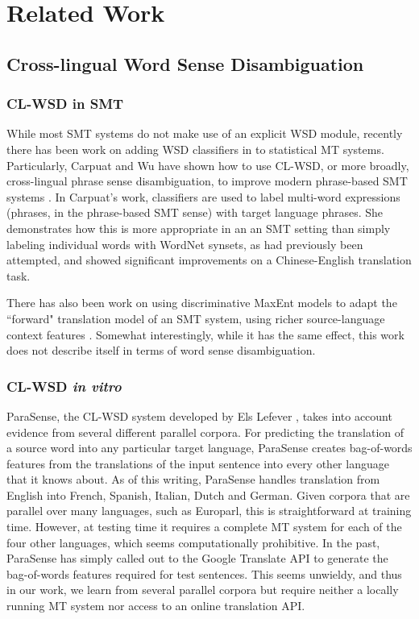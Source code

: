 \section{Related Work}
\label{sec:relatedwork}

\subsection{Cross-lingual Word Sense Disambiguation}

\subsubsection{CL-WSD in SMT}
While most SMT systems do not make use of an explicit WSD module, recently
there has been work on adding WSD classifiers in to statistical MT systems.
Particularly, Carpuat and Wu have shown how to use CL-WSD, or more broadly,
cross-lingual phrase sense disambiguation, to improve modern phrase-based SMT
systems
\cite{carpuatpsd,carpuat-wu:2007:EMNLP-CoNLL2007,carpuat2008evaluation}. In
Carpuat's work, classifiers are used to label multi-word expressions (phrases,
in the phrase-based SMT sense) with target language phrases. She demonstrates
how this is more appropriate in an an SMT setting than simply labeling
individual words with WordNet synsets, as had previously been attempted, and
showed significant improvements on a Chinese-English translation task.

There has also been work on using discriminative MaxEnt models to adapt
the ``forward" translation model of an SMT system, using richer
source-language context features \cite{vzabokrtsky-popel-marevcek:2010:WMT}.
Somewhat interestingly, while it has the same effect, this work does not
describe itself in terms of word sense disambiguation.

\subsubsection{CL-WSD \emph{in vitro}}
ParaSense, the CL-WSD system developed by Els Lefever
\cite{lefever-hoste-decock:2011:ACL-HLT2011}, takes into account evidence from
several different parallel corpora.
For predicting the translation of a source word into
any particular target language, ParaSense creates
bag-of-words features from the translations of the input sentence into every
other language that it knows about. As of this writing, ParaSense handles
translation from English into French, Spanish, Italian, Dutch and German.
Given corpora that are parallel over many languages, such as Europarl, this is
straightforward at
training time. However, at testing time it requires a complete MT system for
each of the four other languages, which seems computationally prohibitive. In
the past, ParaSense has simply called out to the Google Translate API to
generate the bag-of-words features required for test sentences. This seems
unwieldy, and thus in our work, we learn from several parallel corpora but
require neither a locally running MT system nor access to an online translation
API.


